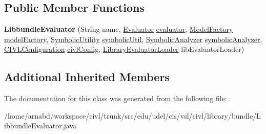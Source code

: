 \subsection*{Public Member Functions}
\begin{DoxyCompactItemize}
\item 
\hypertarget{classedu_1_1udel_1_1cis_1_1vsl_1_1civl_1_1library_1_1bundle_1_1LibbundleEvaluator_ad15d5d6e23d1ff05f7ba76c6d0392956}{}{\bfseries Libbundle\+Evaluator} (String name, \hyperlink{interfaceedu_1_1udel_1_1cis_1_1vsl_1_1civl_1_1semantics_1_1IF_1_1Evaluator}{Evaluator} \hyperlink{classedu_1_1udel_1_1cis_1_1vsl_1_1civl_1_1library_1_1common_1_1BaseLibraryEvaluator_a972ee04104e6fe26bb927ceddb93462d}{evaluator}, \hyperlink{interfaceedu_1_1udel_1_1cis_1_1vsl_1_1civl_1_1model_1_1IF_1_1ModelFactory}{Model\+Factory} \hyperlink{classedu_1_1udel_1_1cis_1_1vsl_1_1civl_1_1library_1_1common_1_1LibraryComponent_ac38a7c7971f70f8c969e55538a17f016}{model\+Factory}, \hyperlink{interfaceedu_1_1udel_1_1cis_1_1vsl_1_1civl_1_1dynamic_1_1IF_1_1SymbolicUtility}{Symbolic\+Utility} \hyperlink{classedu_1_1udel_1_1cis_1_1vsl_1_1civl_1_1library_1_1common_1_1LibraryComponent_a18214426269e7c352f4926264837c8a6}{symbolic\+Util}, \hyperlink{interfaceedu_1_1udel_1_1cis_1_1vsl_1_1civl_1_1semantics_1_1IF_1_1SymbolicAnalyzer}{Symbolic\+Analyzer} \hyperlink{classedu_1_1udel_1_1cis_1_1vsl_1_1civl_1_1library_1_1common_1_1LibraryComponent_a7a1213c02b2d29a79f550c7090594967}{symbolic\+Analyzer}, \hyperlink{classedu_1_1udel_1_1cis_1_1vsl_1_1civl_1_1config_1_1IF_1_1CIVLConfiguration}{C\+I\+V\+L\+Configuration} \hyperlink{classedu_1_1udel_1_1cis_1_1vsl_1_1civl_1_1library_1_1common_1_1LibraryComponent_a223e603cab7a909db88f49c256b2ce98}{civl\+Config}, \hyperlink{interfaceedu_1_1udel_1_1cis_1_1vsl_1_1civl_1_1semantics_1_1IF_1_1LibraryEvaluatorLoader}{Library\+Evaluator\+Loader} lib\+Evaluator\+Loader)\label{classedu_1_1udel_1_1cis_1_1vsl_1_1civl_1_1library_1_1bundle_1_1LibbundleEvaluator_ad15d5d6e23d1ff05f7ba76c6d0392956}

\end{DoxyCompactItemize}
\subsection*{Additional Inherited Members}


The documentation for this class was generated from the following file\+:\begin{DoxyCompactItemize}
\item 
/home/arnabd/workspace/civl/trunk/src/edu/udel/cis/vsl/civl/library/bundle/Libbundle\+Evaluator.\+java\end{DoxyCompactItemize}
